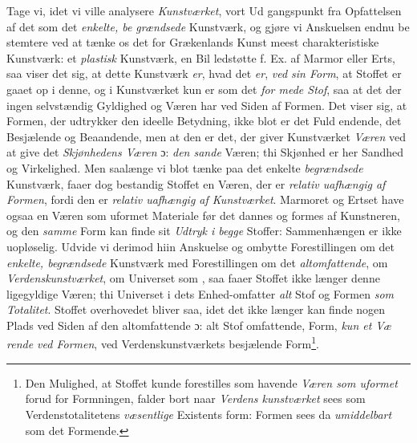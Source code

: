  \setcounter{footnote}{0}
Tage vi, idet vi ville analysere \emph{Kunstværket}, vort Ud\-%
gangspunkt fra Opfattelsen af det som det \emph{enkelte, be\-%
grændsede} Kunstværk, og gjøre vi Anskuelsen endnu be\-%
stemtere ved at tænke os det for Grækenlands Kunst meest
charakteristiske Kunstværk: et \emph{plastisk} Kunstværk, en Bil\-%
ledstøtte f. Ex. af Marmor eller Erts, saa viser det sig, at
dette Kunstværk \emph{er}, hvad det \emph{er}, \emph{ved sin Form}, at Stoffet
er gaaet op i denne, og i Kunstværket kun er som det \emph{for\-%
mede Stof}, saa at det der ingen selvstændig Gyldighed og
Væren har ved Siden af Formen. Det viser sig, at Formen,
der udtrykker den ideelle Betydning, ikke blot er det Fuld\-%
endende, det Besjælende og Beaandende, men at den er det,
der giver Kunstværket \emph{Væren} ved at give det \emph{Skjønhedens
Væren} ɔ: \emph{den sande} Væren; thi Skjønhed er her Sandhed
og Virkelighed. Men saalænge vi blot tænke paa det enkelte
\emph{begrændsede} Kunstværk, faaer dog bestandig Stoffet en
Væren, der er \emph{relativ uafhængig af Formen}, fordi den er
\emph{relativ uafhængig af Kunstværket}. Marmoret og Ertset
have ogsaa en Væren som uformet Materiale før det dannes
og formes af Kunstneren, og den \emph{samme} Form kan finde sit
\emph{Udtryk i begge} Stoffer: Sammenhængen er ikke uopløselig.
Udvide vi derimod hiin Anskuelse og ombytte Forestillingen
om det \emph{enkelte, begrændsede} Kunstværk med Forestillingen
om det \emph{altomfattende}, om \emph{Verdenskunstværket}, om
Universet som , saa faaer Stoffet ikke længer denne
ligegyldige Væren; thi Universet i dets Enhed-omfatter \emph{alt}
Stof og Formen \emph{som Totalitet}. Stoffet overhovedet bliver
saa, idet det ikke længer kan finde nogen Plads ved Siden af
den altomfattende ɔ: alt Stof omfattende, Form, \emph{kun et Væ\-%
rende ved Formen}, ved Verdenskunstværkets besjælende Form\footnote{Den Mulighed, at Stoffet kunde forestilles som havende \emph{Væren
som uformet} forud for Formningen, falder bort naar \emph{Verdens\-%
kunstværket} sees som Verdenstotalitetens \emph{væsentlige} Existents\-%
form: Formen sees da \emph{umiddelbart} som det Formende.}.
